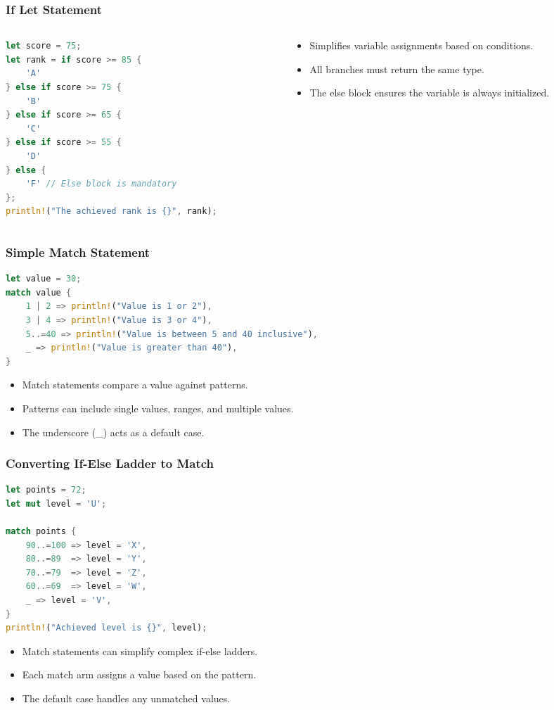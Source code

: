 \documentclass[aspectratio=169, table]{beamer}
\begin{document}
\begin{frame}[fragile]
\frametitle{If Let Statement}
\begin{columns}[t,onlytextwidth]
\begin{column}{0.6\textwidth}
\begin{lstlisting}[language=Rust]
let score = 75; 
let rank = if score >= 85 {  
	'A'
} else if score >= 75 {
	'B'
} else if score >= 65 { 
	'C'
} else if score >= 55 {
	'D'
} else {
	'F' // Else block is mandatory
};
println!("The achieved rank is {}", rank);
\end{lstlisting}
\end{column}
\begin{column}{0.4\textwidth}
\begin{itemize}
\item Simplifies variable assignments based on conditions.
\item All branches must return the same type.
\item The else block ensures the variable is always initialized.
\end{itemize}
\end{column}
\end{columns}
\end{frame}


\begin{frame}[fragile]
\frametitle{Simple Match Statement}
\begin{lstlisting}[language=Rust]
let value = 30; 
match value {
	1 | 2 => println!("Value is 1 or 2"),  
	3 | 4 => println!("Value is 3 or 4"), 
	5..=40 => println!("Value is between 5 and 40 inclusive"),       
	_ => println!("Value is greater than 40"), 
}
\end{lstlisting}
\begin{itemize}
\item Match statements compare a value against patterns.
\item Patterns can include single values, ranges, and multiple values.
\item The underscore (\_) acts as a default case.
\end{itemize}
\end{frame}

\begin{frame}[fragile]
\frametitle{Converting If-Else Ladder to Match}
\vspace{12pt}
\begin{lstlisting}[language=Rust]
let points = 72; 
let mut level = 'U'; 

match points {
	90..=100 => level = 'X', 
	80..=89  => level = 'Y', 
	70..=79  => level = 'Z',
	60..=69  => level = 'W',
	_ => level = 'V',
}
println!("Achieved level is {}", level);
\end{lstlisting}
\begin{itemize}
\item Match statements can simplify complex if-else ladders.
\item Each match arm assigns a value based on the pattern.
\item The default case handles any unmatched values.
\end{itemize}
\end{frame}
\end{document}
